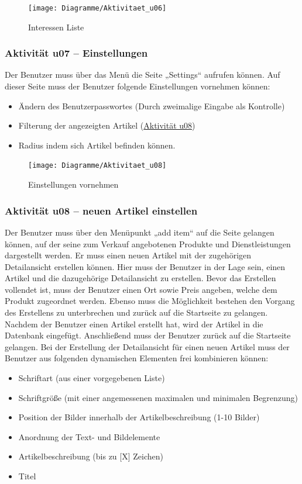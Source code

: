 \documentclass[a4paper,12pt,oneside]{scrartcl}
\begin{document}
\begin{figure}[!htbp]
\centering
\noindent\texttt{[image: Diagramme/Aktivitaet\_u06]}
\caption{Interessen Liste}
\end{figure}
\FloatBarrier


\subsubsection{Aktivität u07 – Einstellungen}
Der Benutzer muss über das Menü die Seite „Settings“ aufrufen können. Auf dieser Seite muss der Benutzer folgende Einstellungen vornehmen können:
\begin{itemize}
	\item Ändern des Benutzerpasswortes (Durch zweimalige Eingabe als Kontrolle)
	\item Filterung der angezeigten Artikel (\hyperlink{u08}{Aktivität u08})
	\item Radius indem sich Artikel befinden können.
\end{itemize}

\begin{figure}[!htbp]
\centering
\noindent\texttt{[image: Diagramme/Aktivitaet\_u08]}
\caption{Einstellungen vornehmen}
\end{figure}
\FloatBarrier


\hypertarget{u08}{\subsubsection{Aktivität u08 – neuen Artikel einstellen}}
Der Benutzer muss über den Menüpunkt „add item“ auf die Seite gelangen können, auf der seine zum Verkauf angebotenen Produkte und Dienstleistungen dargestellt werden. Er muss einen neuen Artikel mit der  zugehörigen Detailansicht erstellen können. Hier muss der Benutzer in der Lage sein, einen Artikel und die dazugehörige Detailansicht zu erstellen. Bevor das Erstellen vollendet ist, muss der Benutzer einen Ort sowie Preis angeben, welche dem Produkt zugeordnet werden. Ebenso muss die Möglichkeit bestehen den Vorgang des Erstellens zu unterbrechen und zurück auf die Startseite zu gelangen. Nachdem der Benutzer einen Artikel erstellt hat, wird der Artikel in die Datenbank eingefügt. Anschließend muss der Benutzer zurück auf die Startseite gelangen. 
Bei der Erstellung der Detailansicht für einen neuen Artikel muss der Benutzer aus folgenden dynamischen Elementen frei kombinieren können:
\begin{itemize}
	\item Schriftart (aus einer vorgegebenen Liste)
	\item Schriftgröße (mit einer angemessenen maximalen und minimalen Begrenzung)
	\item Position der Bilder innerhalb der Artikelbeschreibung (1-10 Bilder)
	\item Anordnung der Text- und Bildelemente
	\item Artikelbeschreibung (bis zu [X] Zeichen)
	\item Titel
\end{itemize}
\end{document}
